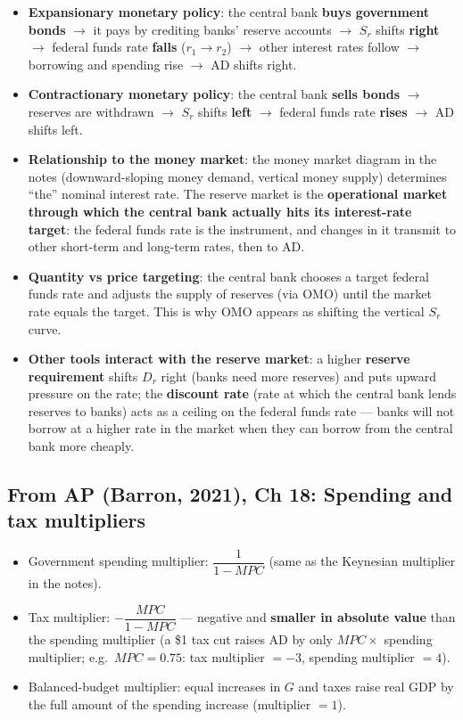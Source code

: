 \documentclass[a4paper,12pt]{article}
\begin{document}
\begin{itemize}
  \item \textbf{Expansionary monetary policy}: the central bank \textbf{buys government bonds} $\to$ it pays by crediting banks' reserve accounts $\to$ $S_r$ shifts \textbf{right} $\to$ federal funds rate \textbf{falls} ($r_1 \to r_2$) $\to$ other interest rates follow $\to$ borrowing and spending rise $\to$ AD shifts right.
  \item \textbf{Contractionary monetary policy}: the central bank \textbf{sells bonds} $\to$ reserves are withdrawn $\to$ $S_r$ shifts \textbf{left} $\to$ federal funds rate \textbf{rises} $\to$ AD shifts left.
  \item \textbf{Relationship to the money market}: the money market diagram in the notes (downward-sloping money demand, vertical money supply) determines ``the'' nominal interest rate. The reserve market is the \textbf{operational market through which the central bank actually hits its interest-rate target}: the federal funds rate is the instrument, and changes in it transmit to other short-term and long-term rates, then to AD.
  \item \textbf{Quantity vs price targeting}: the central bank chooses a target federal funds rate and adjusts the supply of reserves (via OMO) until the market rate equals the target. This is why OMO appears as shifting the vertical $S_r$ curve.
  \item \textbf{Other tools interact with the reserve market}: a higher \textbf{reserve requirement} shifts $D_r$ right (banks need more reserves) and puts upward pressure on the rate; the \textbf{discount rate} (rate at which the central bank lends reserves to banks) acts as a ceiling on the federal funds rate --- banks will not borrow at a higher rate in the market when they can borrow from the central bank more cheaply.
\end{itemize}

\subsection*{From AP (Barron, 2021), Ch 18: Spending and tax multipliers}
\begin{itemize}
  \item Government spending multiplier: $\dfrac{1}{1-MPC}$ (same as the Keynesian multiplier in the notes).
  \item Tax multiplier: $-\dfrac{MPC}{1-MPC}$ --- negative and \textbf{smaller in absolute value} than the spending multiplier (a \$1 tax cut raises AD by only $MPC \times$ spending multiplier; e.g.\ $MPC=0.75$: tax multiplier $=-3$, spending multiplier $=4$).
  \item Balanced-budget multiplier: equal increases in $G$ and taxes raise real GDP by the full amount of the spending increase (multiplier $=1$).
\end{itemize}
\end{document}

